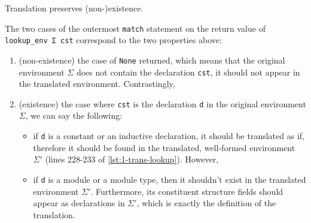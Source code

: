 \begin{listing}[H]
  \caption{Translation preserves (non-)existence.}
  \label{lst:1-trans-lookup}
\end{listing}

The two cases of the outermost \verb|match| statement on the return value of
\verb|lookup_env Σ cst| correspond to the two properties above:
\begin{enumerate}
\item (non-existence) the case of \verb|None| returned, which means that the
  original environment $\Sigma$ does not contain the declaration \verb|cst|, it
  should not appear in the translated environment. Contrastingly,
\item (existence) the case where \verb|cst| is the declaration \verb|d| in the
  original environment $\Sigma$, we can say the following:
  \begin{itemize}
    \item if \verb|d| is a constant or an inductive declaration, it should be
      translated as if, therefore it should be found in the translated,
      well-formed environment $\Sigma'$ (lines 228-233 of
      \ref{lst:1-trans-lookup}). However,
    \item if \verb|d| is a module or a module type, then it shouldn't exist in
    the translated environment $\Sigma'$. Furthermore, its constituent structure
    fields should appear as declarations in $\Sigma'$, which is exactly the
    definition of the translation.
  \end{itemize}
\end{enumerate}